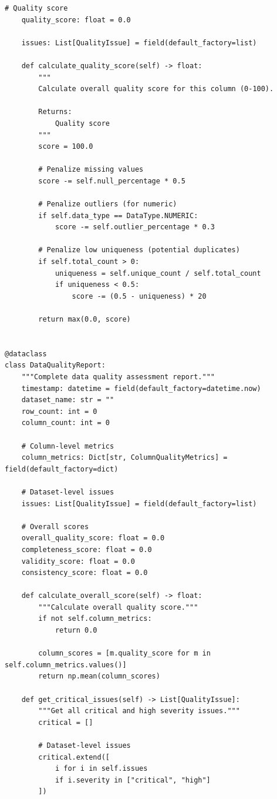 \begin{lstlisting}[style=python, caption={Data quality metrics with statistical validation}]
    # Quality score
    quality_score: float = 0.0

    issues: List[QualityIssue] = field(default_factory=list)

    def calculate_quality_score(self) -> float:
        """
        Calculate overall quality score for this column (0-100).

        Returns:
            Quality score
        """
        score = 100.0

        # Penalize missing values
        score -= self.null_percentage * 0.5

        # Penalize outliers (for numeric)
        if self.data_type == DataType.NUMERIC:
            score -= self.outlier_percentage * 0.3

        # Penalize low uniqueness (potential duplicates)
        if self.total_count > 0:
            uniqueness = self.unique_count / self.total_count
            if uniqueness < 0.5:
                score -= (0.5 - uniqueness) * 20

        return max(0.0, score)


@dataclass
class DataQualityReport:
    """Complete data quality assessment report."""
    timestamp: datetime = field(default_factory=datetime.now)
    dataset_name: str = ""
    row_count: int = 0
    column_count: int = 0

    # Column-level metrics
    column_metrics: Dict[str, ColumnQualityMetrics] = field(default_factory=dict)

    # Dataset-level issues
    issues: List[QualityIssue] = field(default_factory=list)

    # Overall scores
    overall_quality_score: float = 0.0
    completeness_score: float = 0.0
    validity_score: float = 0.0
    consistency_score: float = 0.0

    def calculate_overall_score(self) -> float:
        """Calculate overall quality score."""
        if not self.column_metrics:
            return 0.0

        column_scores = [m.quality_score for m in self.column_metrics.values()]
        return np.mean(column_scores)

    def get_critical_issues(self) -> List[QualityIssue]:
        """Get all critical and high severity issues."""
        critical = []

        # Dataset-level issues
        critical.extend([
            i for i in self.issues
            if i.severity in ["critical", "high"]
        ])


\end{lstlisting}
